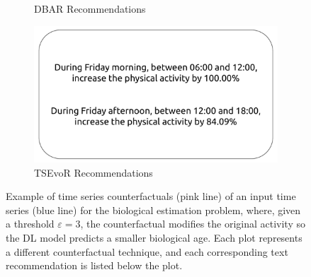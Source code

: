 \begin{figure}[h!]
\begin{subfigure}[b]{0.24\textwidth}
         \caption{DBAR Recommendations}
         \label{fig:reco:dba}
     \end{subfigure}
    \hfill
     \begin{subfigure}[b]{0.24\textwidth}
         \centering
         \includegraphics[width=\textwidth]{images/6306/2_6306_TCN_TSEvo_reco.pdf}
         \caption{TSEvoR Recommendations}
         \label{fig:reco:tsevo}
     \end{subfigure}

    \caption{Example of time series counterfactuals (pink line) of an input time
series (blue line) for the biological estimation problem, where, given a threshold $\varepsilon=3$, the counterfactual modifies the original activity so the DL model predicts a smaller biological age. Each plot represents a different counterfactual technique, and each corresponding text recommendation is listed below the plot.}
    \label{fig:quali-eval}
\end{figure}